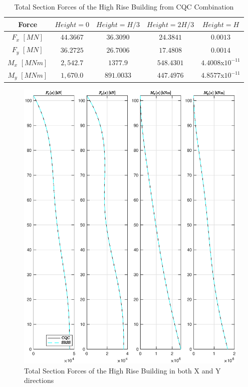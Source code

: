 \documentclass[11pt,a4paper,titlepage]{report}
\begin{document}
\begin{table}[h]
    \centering
    \begin{tabular}{c|c|c|c|c}
    Force & $Height=0$ & $Height=H/3$ & $Height=2H/3$ & $Height=H$\\
    \hline
    $F_x$ $[MN]$  & $44.3667$ & $36.3090$ & $24.3841$ & $0.0013$\\
    $F_y$  $[MN]$ & $36.2725$ & $26.7006$ & $17.4808$ & $0.0014$\\
    $M_x$ $[MNm]$  & $2,542.7$ & $1377.9$ & $548.4301$ & $4.4008$x$10^{-11}$\\
    $M_y$  $[MNm]$ & $1,670.0$ & $891.0033$ & $447.4976$ & $4.8577$x$10^{-11}$\\
    \end{tabular}
    \caption{Total Section Forces of the High Rise Building from CQC Combination}
    \label{tab:total section forces HR CQC}
\end{table}
\newpage
\begin{figure}[h]
    \centering
    \includegraphics[width=14cm]{Total_Section_Forces_HR.eps}
    \caption{Total Section Forces of the High Rise Building in both X and Y directions}
    \label{fig:I.2 total section forces HR}
\end{figure}
\end{document}
